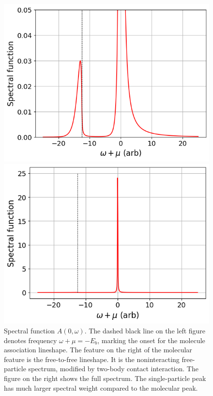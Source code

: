 \documentclass{article}
\theoremstyle{definition}
\begin{document}
\begin{figure}[!htb]
\begin{minipage}{.5\textwidth}
  \centering
  \includegraphics[width=.95\linewidth]{A_fermions_1}
\end{minipage}%
\begin{minipage}{.5\textwidth}
  \centering
  \includegraphics[width=.95\linewidth]{A_fermions_2}
\end{minipage}
\caption{Spectral function $A(0, \omega)$. The dashed black line on the left figure denotes frequency $\omega + \mu = -E_b$, marking the onset for the molecule association lineshape. The feature on the right of the molecular feature is the free-to-free lineshape. It is the noninteracting free-particle spectrum, modified by two-body contact interaction. The figure on the right shows the full spectrum. The single-particle peak has much larger spectral weight compared to the molecular peak.}
\label{fig:fermion-spectrum}
\end{figure}
\end{document}
